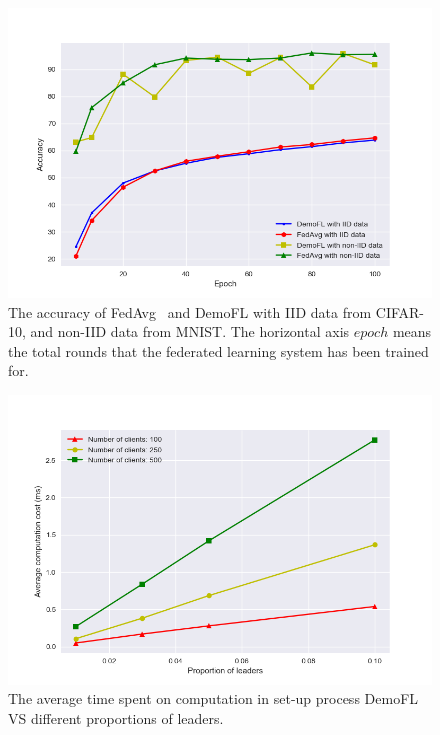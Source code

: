 \begin{figure}[!ht]
    \centering
    \includegraphics[width=\columnwidth]{img/acc.png}
    \caption{The accuracy of FedAvg~\cite{mcmahan2016communicationefficient} and DemoFL with IID data from CIFAR-10, and non-IID data from MNIST. The horizontal axis $epoch$ means the total rounds that the federated learning system has been trained for. }
    \label{acc}
\end{figure}

\begin{figure}[!ht]
    \centering
    \includegraphics[width=\columnwidth]{img/leader-time.png}
    \caption{The average time spent on computation in set-up process DemoFL VS different proportions of leaders.}
    \label{leader-time}
\end{figure}


